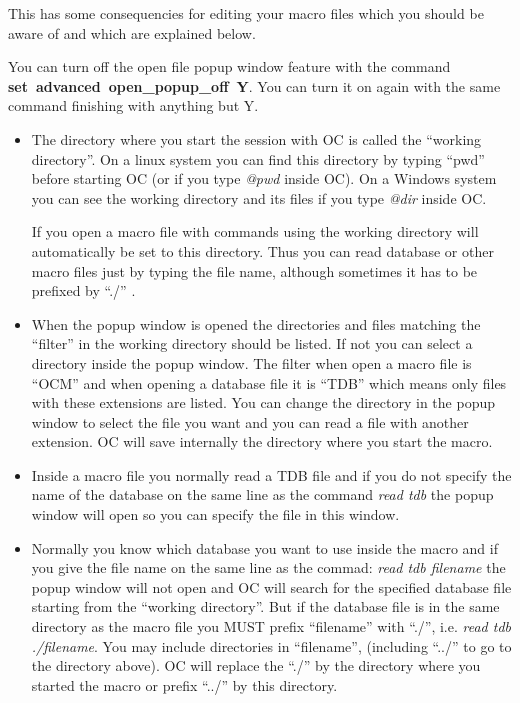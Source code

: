 \documentclass[11pt]{article}
\begin{document}
This has some consequencies for editing your macro files which you
should be aware of and which are explained below.

You can turn off the open file popup window feature with the command
{\bf set~advanced~open\_popup\_off~Y}.  You can turn it on again with
the same command finishing with anything but Y.

\begin{itemize}
\item The directory where you start the session with OC is called the
  ``working directory''.  On a linux system you can find this
  directory by typing ``pwd'' before starting OC (or if you type {\em
    @pwd} inside OC).  On a Windows system you can see the working
  directory and its files if you type {\em @dir} inside OC.

  If you open a macro file with commands using the working directory
  will automatically be set to this directory.  Thus you can read
  database or other macro files just by typing the file name, although
  sometimes it has to be prefixed by ``./'' .
  
\item When the popup window is opened the directories and files
  matching the ``filter'' in the working directory should be listed.
  If not you can select a directory inside the popup window.  The
  filter when open a macro file is ``OCM'' and when opening a database
  file it is ``TDB'' which means only files with these extensions are
  listed.  You can change the directory in the popup window to select
  the file you want and you can read a file with another extension.
  OC will save internally the directory where you start the macro.
  
\item Inside a macro file you normally read a TDB file and if you do
  not specify the name of the database on the same line as the command
  {\em read tdb} the popup window will open so you can specify the
  file in this window.

\item Normally you know which database you want to use inside the
  macro and if you give the file name on the same line as the commad:
  {\em read tdb filename} the popup window will not open and OC will
  search for the specified database file starting from the ``working
  directory''.  But if the database file is in the same directory as
  the macro file you MUST prefix ``filename'' with ``./'', i.e. {\em
    read tdb ./filename}.  You may include directories in
  ``filename'', (including ``../'' to go to the directory above).  OC
  will replace the ``./'' by the directory where you started the macro
  or prefix ``../'' by this directory.


\end{itemize}
\end{document}

